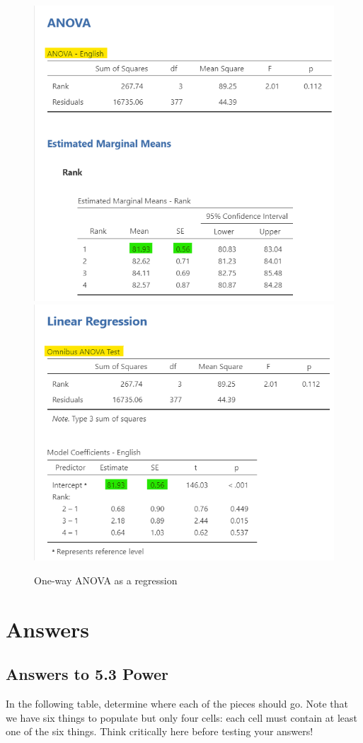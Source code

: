 \documentclass[
]{book}
\begin{document}
\begin{figure}

{\centering \includegraphics[width=0.49\linewidth]{images/14-regression-wrap-up/anova1} \includegraphics[width=0.49\linewidth]{images/14-regression-wrap-up/anova2} 

}

\caption{One-way ANOVA as a regression}\label{fig:unnamed-chunk-1}
\end{figure}

\hypertarget{appendix-appendices}{%
\appendix}


\hypertarget{answers}{%
\chapter{Answers}\label{answers}}

\hypertarget{answers-to-5.3-power}{%
\section{Answers to 5.3 Power}\label{answers-to-5.3-power}}

In the following table, determine where each of the pieces should go. Note that we have six things to populate but only four cells: each cell must contain at least one of the six things. Think critically here before testing your answers!
\end{document}
